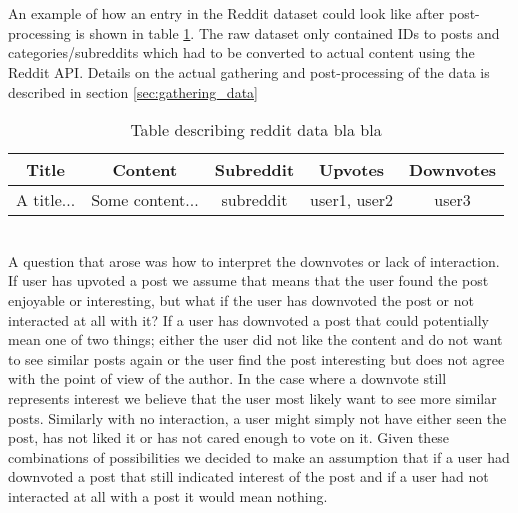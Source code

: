 \\\\
An example of how an entry in the Reddit dataset could look like after post-processing is shown in table \ref{table:example_reddit_data}. The raw dataset only contained IDs to posts and categories/subreddits which had to be converted to actual content using the Reddit API. Details on the actual gathering and post-processing of the data is described in section \ref{sec:gathering_data}
\begin{table}[h!]
    \centering
    \begin{tabular}{ |c|c|c|c|c| } 
        \hline
        \textbf{Title} & \textbf{Content} & \textbf{Subreddit} & \textbf{Upvotes} & \textbf{Downvotes} \\
        \hline
        \hline
        A title... & Some content... & subreddit & user1, user2 & user3\\
        \hline
    \end{tabular}
    \caption{Table describing reddit data  bla bla}
    \label{table:example_reddit_data}
\end{table}
\\
A question that arose was how to interpret the downvotes or lack of interaction. If user has upvoted a post we assume that  means that the user found the post enjoyable or interesting, but what if the user has downvoted the post or not interacted at all with it? If a user has downvoted a post that could potentially mean one of two things; either the user did not like the content and do not want to see similar posts again or the user find the post interesting but does not agree with the point of view of the author. In the case where a downvote still represents interest we believe that the user most likely want to see more similar posts. Similarly with no interaction, a user might simply not have either seen the post, has not liked it or has not cared enough to vote on it. Given these combinations of possibilities we decided to make an assumption that if a user had downvoted a post that still indicated interest of the post and if a user had not interacted at all with a post it would mean nothing.

